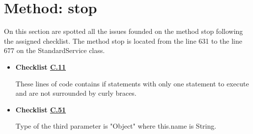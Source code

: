 \documentclass[../../../../dd.tex]{subfiles}
\begin{document}
	\section{Method: stop}

		On this section are spotted all the issues founded on the method stop following the assigned checklist.
		The method stop is located from the line 631 to the line 677 on the StandardService class.
		\begin{itemize}

			\item \textbf{Checklist \hyperref[C:11]{C.11}}

				  

				  These lines of code contains if statements with only one statement to execute and are not surrounded by curly braces.

			\item \textbf{Checklist \hyperref[C:51]{C.51}}

				  

				  Type of the third parameter is "Object" where this.name is String.
				  
		\end{itemize}
\end{document}

